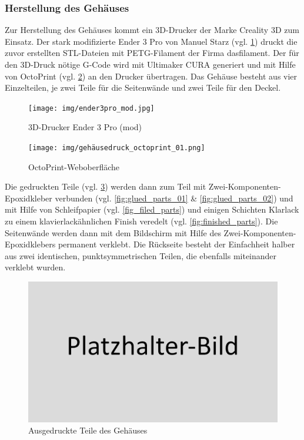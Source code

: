 \subsubsection{Herstellung des Gehäuses}
Zur Herstellung des Gehäuses kommt ein 3D-Drucker der Marke Creality 3D zum Einsatz. Der stark modifizierte Ender 3 Pro von Manuel Starz (vgl. \ref{fig:ender3}) druckt die zuvor erstellten STL-Dateien mit PETG-Filament der Firma dasfilament. Der für den 3D-Druck nötige G-Code wird mit Ultimaker CURA generiert und mit Hilfe von OctoPrint (vgl. \ref{fig:octoprint}) an den Drucker übertragen. Das Gehäuse besteht aus vier Einzelteilen, je zwei Teile für die Seitenwände und zwei Teile für den Deckel.\par
\begin{figure}[h!tb]
	\begin{center}
	\texttt{[image: img/ender3pro\_mod.jpg]}
	\end{center}
	\caption[3D-Drucker Ender 3 Pro (mod)]{3D-Drucker Ender 3 Pro (mod)}
	\label{fig:ender3}
\end{figure}
\begin{figure}[h!tb]
	\texttt{[image: img/gehäusedruck\_octoprint\_01.png]}
	\caption[OctoPrint-Weboberfläche]{OctoPrint-Weboberfläche}
	\label{fig:octoprint}
\end{figure}
Die gedruckten Teile (vgl. \ref{fig:printet_parts}) werden dann zum Teil mit Zwei-Komponenten-Epoxidkleber verbunden (vgl. \ref{fig:glued_parts_01} \& \ref{fig:glued_parts_02}) und mit Hilfe von Schleifpapier (vgl. \ref{fig_filed_parts}) und einigen Schichten Klarlack zu einem klavierlackähnlichen Finish veredelt (vgl. \ref{fig:finished_parts}). Die Seitenwände werden dann mit dem Bildschirm mit Hilfe des Zwei-Komponenten-Epoxidklebers permanent verklebt. Die Rückseite besteht der Einfachheit halber aus zwei identischen, punktsymmetrischen Teilen, die ebenfalls miteinander verklebt wurden.\par
\begin{figure}[h!tb]
	\includegraphics[width=1\textwidth]{img/placeholder.png}
	\caption[Ausgedruckte Teile des Gehäuses]{Ausgedruckte Teile des Gehäuses}
	\label{fig:printet_parts}
\end{figure}
